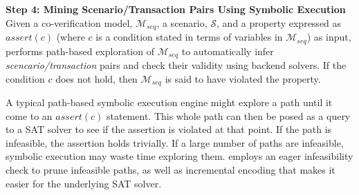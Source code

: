 \textbf{Step 4: Mining Scenario/Transaction Pairs Using Symbolic Execution}
Given a co-verification model, $\mathcal{M}_{seq}$, a scenario, 
$\mathcal{S}$, and a property expressed as $\mathit{assert}(c)$ 
(where $c$ is a condition stated in terms of variables in $\mathcal{M}_{seq}$)
as input, \verifox performs path-based exploration of $\mathcal{M}_{seq}$ 
to automatically infer {\em scencario/transaction} pairs and check their validity 
using backend solvers. If the condition $c$ does not hold, 
then $\mathcal{M}_{seq}$ is said to have violated the property. 

A typical path-based symbolic execution engine might explore 
a path until it come to an $\mathit{assert}(c)$ statement.
This whole path can then be posed as a query to a SAT solver to see if the 
assertion is violated at that point. If the path is infeasible, the assertion
holds trivially. If a large number of paths are infeasible, symbolic 
execution may waste time exploring them. \verifox employs 
an eager infeasibility check to prune infeasible paths, 
as well as incremental encoding that makes
it easier for the underlying SAT solver. 
